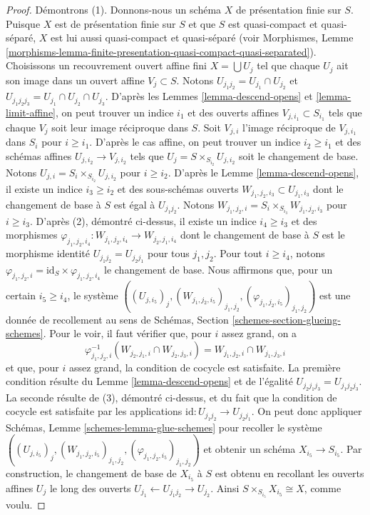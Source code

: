 \begin{proof}
\medskip\noindent
Démontrons (1). Donnons-nous un schéma $X$ de présentation finie
sur $S$. Puisque $X$ est de présentation finie
sur $S$ et que $S$ est quasi-compact et quasi-séparé,
$X$ est lui aussi quasi-compact et quasi-séparé
(voir Morphismes,
Lemme \ref{morphisms-lemma-finite-presentation-quasi-compact-quasi-separated}).
Choisissons un recouvrement ouvert affine fini $X = \bigcup U_j$
tel que chaque $U_j$ ait son image dans un ouvert affine $V_j \subset S$.
Notons $U_{j_1j_2} = U_{j_1} \cap U_{j_2}$ et
$U_{j_1j_2j_3} = U_{j_1} \cap U_{j_2} \cap U_{j_3}$.
D'après les Lemmes \ref{lemma-descend-opens} et \ref{lemma-limit-affine},
on peut trouver un indice $i_1$ et des ouverts affines $V_{j, i_1} \subset S_{i_1}$
tels que chaque $V_j$ soit leur image réciproque dans $S$.
Soit $V_{j, i}$ l'image réciproque de $V_{j, i_1}$ dans $S_i$ pour
$i \geq i_1$. D'après le cas affine, on peut trouver un indice $i_2 \geq i_1$ et
des schémas affines $U_{j, i_2} \to V_{j, i_2}$ tels
que $U_j = S \times_{S_{i_2}} U_{j, i_2}$ soit le changement de base.
Notons $U_{j, i} = S_i \times_{S_{i_2}} U_{j, i_2}$ pour $i \geq i_2$.
D'après le Lemme \ref{lemma-descend-opens}, il existe un indice
$i_3 \geq i_2$ et des sous-schémas ouverts
$W_{j_1, j_2, i_3} \subset U_{j_1, i_3}$
dont le changement de base à $S$ est égal à $U_{j_1j_2}$.
Notons $W_{j_1, j_2, i} = S_i \times_{S_{i_3}} W_{j_1, j_2, i_3}$
pour $i \geq i_3$. D'après (2), démontré ci-dessus, il existe un indice
$i_4 \geq i_3$ et des morphismes
$\varphi_{j_1, j_2, i_4} : W_{j_1, j_2, i_4} \to W_{j_2, j_1, i_4}$
dont le changement de base à $S$ est le morphisme identité
$U_{j_1j_2} = U_{j_2j_1}$ pour tous $j_1, j_2$.
Pour tout $i \geq i_4$, notons
$\varphi_{j_1, j_2, i} = \text{id}_S \times \varphi_{j_1, j_2, i_4}$
le changement de base. Nous affirmons que, pour un certain $i_5 \geq i_4$, le système
$((U_{j, i_5})_j, (W_{j_1, j_2, i_5})_{j_1, j_2},
(\varphi_{j_1, j_2, i_5})_{j_1, j_2})$ est une donnée de recollement
au sens de Schémas, Section \ref{schemes-section-glueing-schemes}.
Pour le voir, il faut vérifier que, pour $i$ assez grand,
on a
$$
\varphi_{j_1, j_2, i}^{-1}(W_{j_2, j_1, i} \cap W_{j_2, j_3, i})
=
W_{j_1, j_2, i} \cap W_{j_1, j_3, i}
$$
et que, pour $i$ assez grand, la condition de cocycle est satisfaite.
La première condition résulte du Lemme \ref{lemma-descend-opens}
et de l'égalité $U_{j_2j_1j_3} = U_{j_1j_2j_3}$.
La seconde résulte de (3), démontré ci-dessus, et du fait
que la condition de cocycle est satisfaite par les applications
$\text{id} : U_{j_1j_2} \to U_{j_2j_1}$.
On peut donc appliquer Schémas, Lemme \ref{schemes-lemma-glue-schemes}
pour recoller le système
$((U_{j, i_5})_j, (W_{j_1, j_2, i_5})_{j_1, j_2},
(\varphi_{j_1, j_2, i_5})_{j_1, j_2})$ et obtenir un schéma
$X_{i_5} \to S_{i_5}$. Par construction, le changement de base de
$X_{i_5}$ à $S$ est obtenu en recollant les ouverts affines
$U_j$ le long des ouverts $U_{j_1} \leftarrow U_{j_1j_2} \rightarrow U_{j_2}$.
Ainsi $S \times_{S_{i_5}} X_{i_5} \cong X$, comme voulu.
\end{proof}

